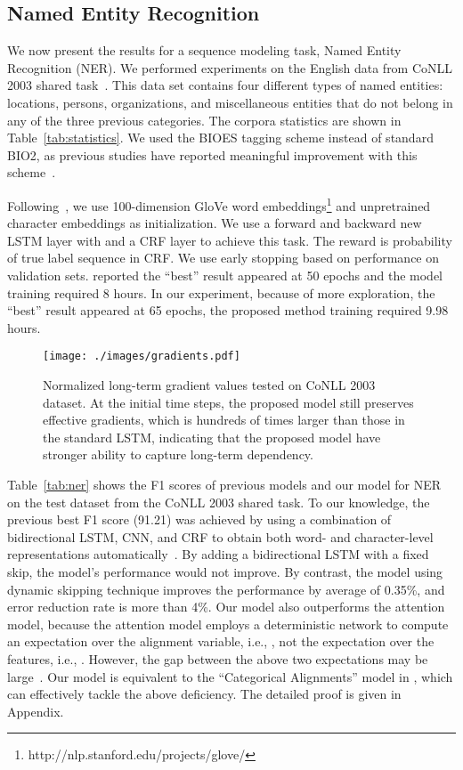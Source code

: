 \documentclass[letterpaper]{article} \usepackage{aaai19}  \usepackage{times}  \usepackage{helvet}  \usepackage{courier}  \usepackage{url}  \usepackage{graphicx}  \usepackage{amsmath}
\begin{document}
\subsection{Named Entity Recognition}
We now present the results for a sequence modeling task, Named Entity Recognition (NER). We performed experiments on the English data from CoNLL 2003 shared task~\cite{tjong2003introduction}. This data set contains four different types of named entities: locations, persons, organizations, and miscellaneous entities that do not belong in any of the three previous categories. The corpora statistics are shown in Table~\ref{tab:statistics}. We used the BIOES tagging scheme instead of standard BIO2, as previous studies have reported meaningful improvement with this scheme~\cite{lample2016neural,ma2016end}.



Following~\cite{ma2016end}, we use 100-dimension GloVe word embeddings\footnote{ http://nlp.stanford.edu/projects/glove/} and unpretrained character embeddings as initialization. We use a forward and backward new LSTM layer with  and a CRF layer to achieve this task. The reward is probability of true label sequence in CRF. We use early stopping based on performance on validation sets. \citeauthor{ma2016end}  reported the “best” result appeared at 50 epochs and the model training required 8 hours. In our experiment, because of more exploration, the “best” result appeared at 65 epochs, the proposed method training required 9.98 hours.

\begin{figure}[t]
\centering
  \texttt{[image: ./images/gradients.pdf]}
  \caption{Normalized long-term gradient values  tested on CoNLL 2003 dataset. At the initial time steps, the proposed model still preserves effective gradients, which is hundreds of times larger than those in the standard LSTM, indicating that the proposed model have stronger ability to capture long-term dependency.} \label{fig:gradient}
\end{figure}


Table~\ref{tab:ner} shows the F1 scores of previous models and our model for NER on the test dataset from the CoNLL 2003 shared task. To our knowledge, the previous best F1 score (91.21) was achieved by using a combination of bidirectional LSTM, CNN, and CRF to obtain both word- and character-level representations automatically~\cite{ma2016end}. By adding a bidirectional LSTM with a fixed skip, the model's performance would not improve. By contrast, the model using dynamic skipping technique improves the performance by average of 0.35\%, and error reduction rate is more than 4\%. Our model also outperforms the attention model, because the attention model employs a deterministic network to compute an expectation over the alignment variable, i.e., , not the expectation over the features, i.e., . However, the gap between the above two expectations may be large~\cite{deng2018latent}. Our model is equivalent to the ``Categorical Alignments'' model in \cite{deng2018latent}, which can effectively tackle the above deficiency. The detailed proof is given in Appendix.
\end{document}

